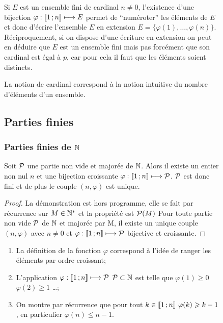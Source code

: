 \begin{figure}
Si \(E\) est un ensemble fini de cardinal \(n\neq 0\), l'existence d'une bijection \(\varphi:\intervalleentier{1}{n} \longmapsto E\) permet de ``numéroter'' les éléments de \(E\) et donc d'écrire l'ensemble \(E\) en extension \(E=\{\varphi(1), \ldots, \varphi(n)\}\).
Réciproquement, si on dispose d'une écriture en extension on peut en déduire que \(E\) est un ensemble fini mais pas forcément que son cardinal est égal à \(p\), car pour cela il faut que les éléments soient distincts.

La notion de cardinal correspond à la notion intuitive du nombre d'éléments d'un ensemble.

\subsection{Parties finies}

\subsubsection{Parties finies de \(\N\)}

\begin{theo}\label{theo:partfinN}
  Soit \(\P\) une partie non vide et majorée de \(\N\). Alors il existe un entier non nul \(n\) et une bijection croissante \(\varphi:\intervalleentier{1}{n} \longmapsto \P\). \(\P\) est donc fini et de plus le couple \((n,\varphi)\) est unique.
\end{theo}
\begin{proof}
  La démonstration est hors programme, elle se fait par récurrence sur \(M\in\N^*\) et la propriété est \(\P(M)\) Pour toute partie non vide \(\P\) de \(\N\) et majorée par M, il existe un unique couple \((n,\varphi)\) avec \(n\neq 0\) et \(\varphi:\intervalleentier{1}{n} \longmapsto \P\) bijective et croissante. 
\end{proof}

\begin{enumerate}
\item La définition de la fonction \(\varphi\) correspond à l'idée de ranger les éléments par ordre croissant;
\item L'application \(\varphi:\intervalleentier{1}{n} \longmapsto \P\) \(\P \subset \N\) est telle que \(\varphi(1)\geqslant 0\) \(\varphi(2)\geqslant 1\) \ldots;
\item On montre par récurrence que pour tout \(k\in\intervalleentier{1}{n} \ \varphi(k)\geqslant k-1\), en particulier \(\varphi(n)\leqslant n-1\). 


\end{enumerate}
\end{figure}
